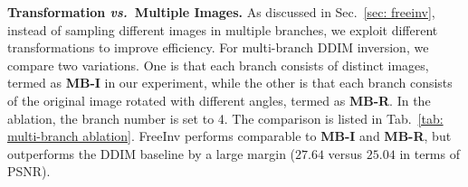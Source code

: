 \documentclass{article}
\begin{document}
\begin{table}[h]
\vspace{-1mm}
\centering
\caption{Ablation study on the number of MC sampling steps.}
\label{tab: MC sampling}
\vspace{-1mm}
\end{table}


\noindent \textbf{Transformation \emph{vs.}~Multiple Images.}
As discussed in Sec.~\ref{sec: freeinv}, instead of sampling different images in multiple branches, we exploit different transformations to improve efficiency.
For multi-branch DDIM inversion, we compare two variations. One is that each branch consists of distinct images, termed as \textbf{MB-I} in our experiment, while the other is that each branch consists of the original image rotated with different angles, termed as \textbf{MB-R}. In the ablation, the branch number is set to 4.
The comparison is listed in Tab.~\ref{tab: multi-branch ablation}. 
FreeInv performs comparable to \textbf{MB-I} and \textbf{MB-R}, but outperforms the DDIM baseline by a large margin ($27.64$ versus $25.04$ in terms of PSNR).
\end{document}
